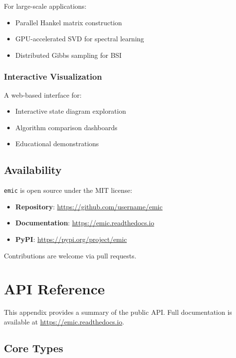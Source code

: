 \documentclass[11pt,a4paper]{report}
\theoremstyle{definition}
\theoremstyle{plain}
\newcommand{\emic}{\texttt{emic}}
\begin{document}
For large-scale applications:
\begin{itemize}
    \item Parallel Hankel matrix construction
    \item GPU-accelerated SVD for spectral learning
    \item Distributed Gibbs sampling for BSI
\end{itemize}

\subsection{Interactive Visualization}

A web-based interface for:
\begin{itemize}
    \item Interactive state diagram exploration
    \item Algorithm comparison dashboards
    \item Educational demonstrations
\end{itemize}

\section{Availability}

\emic{} is open source under the MIT license:

\begin{itemize}
    \item \textbf{Repository}: \url{https://github.com/username/emic}
    \item \textbf{Documentation}: \url{https://emic.readthedocs.io}
    \item \textbf{PyPI}: \url{https://pypi.org/project/emic}
\end{itemize}

Contributions are welcome via pull requests.

\appendix

\chapter{API Reference}
\label{app:api}

This appendix provides a summary of the public API. Full documentation is available at \url{https://emic.readthedocs.io}.

\section{Core Types}
\end{document}
